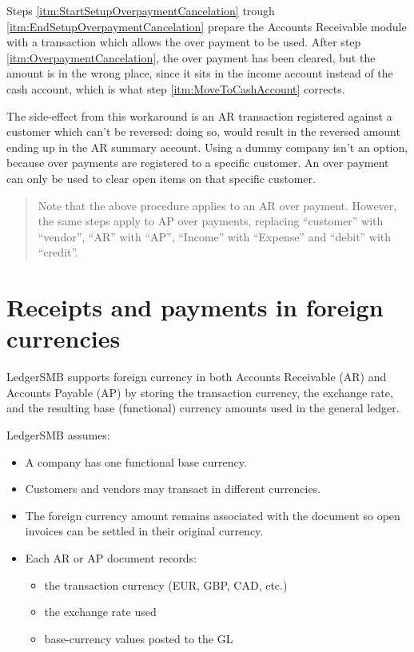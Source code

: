 Steps \ref{itm:StartSetupOverpaymentCancelation} trough \ref{itm:EndSetupOverpaymentCancelation}
prepare the Accounts Receivable module with a transaction which allows the over payment to be used.
After step \ref{itm:OverpaymentCancelation}, the over payment has been cleared, but the
amount is in the wrong place, since it sits in the income account instead of the cash account,
which is what step \ref{itm:MoveToCashAccount} corrects.

The side-effect from this workaround is an AR transaction registered against a \gls{customer} which can't
be reversed: doing so, would result in the reversed amount ending up in the AR summary account.  Using
a dummy company isn't an option, because over payments are registered to a specific \gls{customer}.  An
over payment can only be used to clear open items on that specific \gls{customer}.

\begin{quote}
Note that the above procedure applies to an AR over payment. However, the same steps apply to
AP over payments, replacing ``customer'' with ``vendor'', ``AR'' with ``AP'', ``Income'' with
``Expense'' and ``debit'' with ``credit''.
\end{quote}

\section{Receipts and payments in foreign currencies}
\label{sec-business-processes-payment-processing-fx-payments}

LedgerSMB supports foreign currency in both Accounts Receivable (AR) and Accounts Payable (AP) by storing the transaction currency, the exchange rate, and the resulting base (functional) currency amounts used in the general ledger. 

LedgerSMB assumes:
\begin{itemize}
\item A company has one functional base currency.
\item Customers and vendors may transact in different currencies.
\item The foreign currency amount remains associated with the document so open invoices can be settled in their original currency.
\item Each AR or AP document records:
\begin{itemize}
\item the transaction currency (EUR, GBP, CAD, etc.)
\item the exchange rate used
\item base-currency values posted to the GL
\end{itemize}
\end{itemize}


